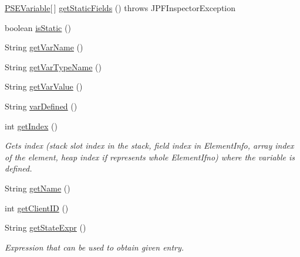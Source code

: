 \begin{DoxyCompactItemize}
\hyperlink{classgov_1_1nasa_1_1jpf_1_1inspector_1_1common_1_1pse_1_1_p_s_e_variable}{P\+S\+E\+Variable}\mbox{[}$\,$\mbox{]} \hyperlink{classgov_1_1nasa_1_1jpf_1_1inspector_1_1common_1_1pse_1_1_p_s_e_variable_object_a17f5bb8ae1dbdc9ad65ad32b1dd80308}{get\+Static\+Fields} ()  throws J\+P\+F\+Inspector\+Exception 
\item 
boolean \hyperlink{classgov_1_1nasa_1_1jpf_1_1inspector_1_1common_1_1pse_1_1_p_s_e_variable_aabbed2b1c69ba2d76924bfa645a1502e}{is\+Static} ()
\item 
String \hyperlink{classgov_1_1nasa_1_1jpf_1_1inspector_1_1common_1_1pse_1_1_p_s_e_variable_ad1dc9e7dbc65a93af7c028831963c26f}{get\+Var\+Name} ()
\item 
String \hyperlink{classgov_1_1nasa_1_1jpf_1_1inspector_1_1common_1_1pse_1_1_p_s_e_variable_ae3ebfecacb0600cb08019e22c220d888}{get\+Var\+Type\+Name} ()
\item 
String \hyperlink{classgov_1_1nasa_1_1jpf_1_1inspector_1_1common_1_1pse_1_1_p_s_e_variable_a58c0acb6295c44b5f04af6b04dca0641}{get\+Var\+Value} ()
\item 
String \hyperlink{classgov_1_1nasa_1_1jpf_1_1inspector_1_1common_1_1pse_1_1_p_s_e_variable_aad5dd7fa8129442acd6fa032e1e2f59b}{var\+Defined} ()
\item 
int \hyperlink{classgov_1_1nasa_1_1jpf_1_1inspector_1_1common_1_1pse_1_1_p_s_e_variable_ae8822dec7015fb0e5509dc4f01e18232}{get\+Index} ()
\begin{DoxyCompactList}\small\item\em Gets index (stack slot index in the stack, field index in Element\+Info, array index of the element, heap index if represents whole Element\+Ifno) where the variable is defined. \end{DoxyCompactList}\item 
String \hyperlink{classgov_1_1nasa_1_1jpf_1_1inspector_1_1common_1_1pse_1_1_program_state_entry_ac96b4ceba0c8c9c674b0cca509b63a3b}{get\+Name} ()
\item 
int \hyperlink{classgov_1_1nasa_1_1jpf_1_1inspector_1_1common_1_1pse_1_1_program_state_entry_a5f1b62c50f124c1bd01be0111706a1f5}{get\+Client\+ID} ()
\item 
String \hyperlink{classgov_1_1nasa_1_1jpf_1_1inspector_1_1common_1_1pse_1_1_program_state_entry_a9d819571ca1cc982a7d31df70548fd96}{get\+State\+Expr} ()
\begin{DoxyCompactList}\small\item\em Expression that can be used to obtain given entry. \end{DoxyCompactList}\end{DoxyCompactItemize}
